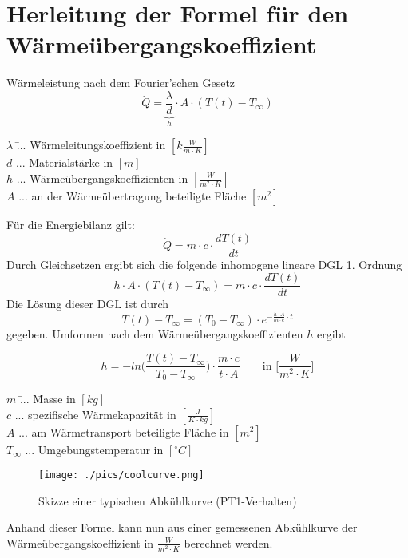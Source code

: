 \documentclass[a4paper, 10pt]{scrartcl}
\begin{document}
	\section{Herleitung der Formel für den Wärmeübergangskoeffizient}
		Wärmeleistung nach dem Fourier'schen Gesetz
		\[\dot{Q} = \underbrace{\dfrac{\lambda}{d}}_{h}\cdot A\cdot (T(t) - T_{\infty}) \]
		\begin{tabbing}
			$ \lambda $ \= ... \= Wärmeleitungskoeffizient in $ [k\frac{W}{m\cdot K}] $\\	
			$ d $ \> ... \> Materialstärke in $ [m] $\\	
			$ h $ \> ... \> Wärmeübergangskoeffizienten in $ [\frac{W}{m^{2}\cdot K}] $\\
			$ A $ \> ... \> an der Wärmeübertragung beteiligte Fläche $ [m^{2}] $\\
		\end{tabbing}
		Für die Energiebilanz gilt:
		\[\dot{Q} = m\cdot c\cdot \dfrac{dT(t)}{dt}\]
		Durch Gleichsetzen ergibt sich die folgende inhomogene lineare DGL 1. Ordnung
		\[h\cdot A\cdot (T(t) - T_{\infty}) =  m\cdot c\cdot \dfrac{dT(t)}{dt}\]
		Die Lösung dieser DGL ist durch
		\[T(t) - T_{\infty} = (T_{0}-T_{\infty})\cdot e^{-\frac{h\cdot A}{m\cdot c}\cdot t}\]
		gegeben. Umformen nach dem Wärmeübergangskoeffizienten $ h $ ergibt 
		\begin{tcolorbox}[title=Wärmeübergangskoeffizienten $ h $]
			\[h = -ln\bigg(\dfrac{T(t) - T_{\infty}}{T_{0}-T_{\infty}}\bigg)\cdot \dfrac{m\cdot c}{t\cdot A}  \qquad \text{in } \bigg[\frac{W}{m^{2}\cdot K}\bigg]\]
			\tcblower
			\begin{tabbing}
				$ m $ \= ... \= Masse in $ [kg] $\\	
				$ c $ \> ... \> spezifische Wärmekapazität in $ [\frac{J}{K\cdot kg}] $\\	
				$ A $ \> ... \> am Wärmetransport beteiligte Fläche in $ [m^{2}] $\\
				$ T_{\infty} $ \> ... \> Umgebungstemperatur in $ [^{\circ}C] $\\
			\end{tabbing}
			
		\end{tcolorbox}	
		\begin{figure}[h!]
			\centering
			\texttt{[image: ./pics/coolcurve.png]}
			\caption{Skizze einer typischen Abkühlkurve (PT1-Verhalten)}
		\end{figure}
		
		Anhand dieser Formel kann nun aus einer gemessenen Abkühlkurve der Wärmeübergangskoeffizient in $ \frac{W}{m^{2}\cdot K} $ berechnet werden. 
\end{document}
